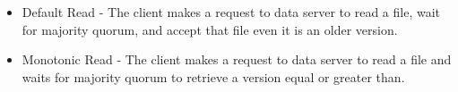 \begin{itemize}
\item Default Read - The client makes a request to data server to read a file,  wait for majority quorum, and accept  that file even it is an older version.

\item Monotonic Read - The client makes a request to data server to read a file and waits for majority quorum to retrieve  a version equal or greater than.
\end{itemize}
